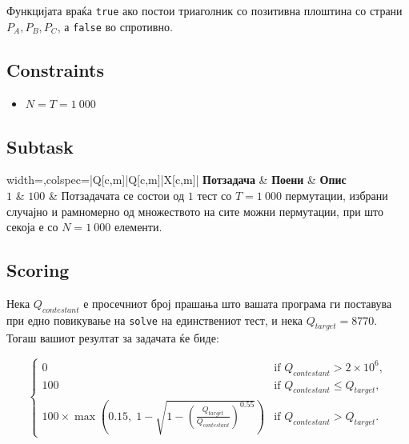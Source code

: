 \documentclass[12pt]{article}
\begin{document}
Функцијата враќа \texttt{true} ако постои триаголник со позитивна плоштина со страни $P_A,P_B,P_C$, а \texttt{false} во спротивно.

\subsection{Constraints}
\vspace{0.1em}
\begin{itemize}
	\item $N = T = 1~000$
\end{itemize}

\subsection{Subtask}
\begin{table}[H]
	\begin{tblr}{width=\linewidth,colspec={|Q[c,m]|Q[c,m]|X[c,m]|}}
		\hline
		\textbf{Потзадача} & \textbf{Поени} & \textbf{Опис}\\
		\hline
		$1$ & $100$ & Потзадачата се состои од $1$ тест со $T=1~000$ пермутации, избрани случајно и рамномерно од множеството на сите можни пермутации, при што секоја е со $N=1~000$ елементи.  \\ 
		\hline
	\end{tblr}
	\caption*{Поените за дадена потзадача се добиваат само ако успешно се поминати сите тестови за неа.}
\end{table}
\FloatBarrier

\newpage
\subsection{Scoring}

Нека $Q_{contestant}$ е просечниот број прашања што вашата програма ги поставува при едно повикување на \texttt{solve} на единствениот тест, и нека $Q_{target}=8770$. Тогаш вашиот резултат за задачата ќе биде:

\[
\begin{cases}
0 & \text{if } Q_{contestant} > 2\times 10^6, \\
100 & \text{if } Q_{contestant} \le Q_{target}, \\
100 \times \max\left(0.15,\; 1-\sqrt{1-\left(\frac{Q_{target}}{Q_{contestant}}\right)^{0.55}}\right) & \text{if } Q_{contestant} > Q_{target}.
\end{cases}
\]
\end{document}
